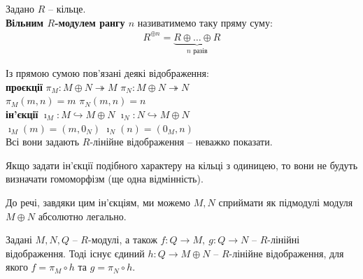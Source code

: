 \documentclass{math_library}
\begin{document}
\begin{definition}
Задано $R$ -- кільце.\\
\textbf{Вільним $R$-модулем рангу $n$} називатимемо таку пряму суму:
\begin{align*}
R^{\oplus n} = \underbrace{R \oplus \dots \oplus R}_{n\text{ разів}}
\end{align*}
\end{definition}

Із прямою сумою пов'язані деякі відображення:\\
\textbf{проєкції} \qquad $\pi_M \colon M \oplus N \twoheadrightarrow M$ \qquad $\pi_N \colon M \oplus N \twoheadrightarrow N$\\
 \qquad $\pi_M(m,n) = m$ \qquad\qquad $\pi_N(m,n) = n$
\bigskip \\
\textbf{ін'єкції} \qquad $\imath_M \colon M \hookrightarrow M \oplus N$ \qquad $\imath_N \colon N \hookrightarrow M \oplus N$\\
 \qquad $\imath_M(m) = (m,0_N)$ \qquad\qquad $\imath_N(n) = (0_M,n)$\\
Всі вони задають $R$-лінійне відображення -- неважко показати.

\begin{remark}
Якщо задати ін'єкції подібного характеру на кільці з одиницею, то вони не будуть визначати гомоморфізм (ще одна відмінність).
\end{remark}

До речі, завдяки цим ін'єкціям, ми можемо $M,N$ сприймати як підмодулі модуля $M \oplus N$ абсолютно легально.

\begin{proposition}
Задані $M,N,Q$ -- $R$-модулі, а також $f \colon Q \to M,\ g \colon Q \to N$ -- $R$-лінійні відображення. Тоді існує єдиний $h \colon Q \to M \oplus N$ -- $R$-лінійне відображення, для якого $f = \pi_M \circ h$ та $g = \pi_N \circ h$.
\begin{figure}[H]
\centering
{}
\end{figure}
\end{proposition}
\end{document}
